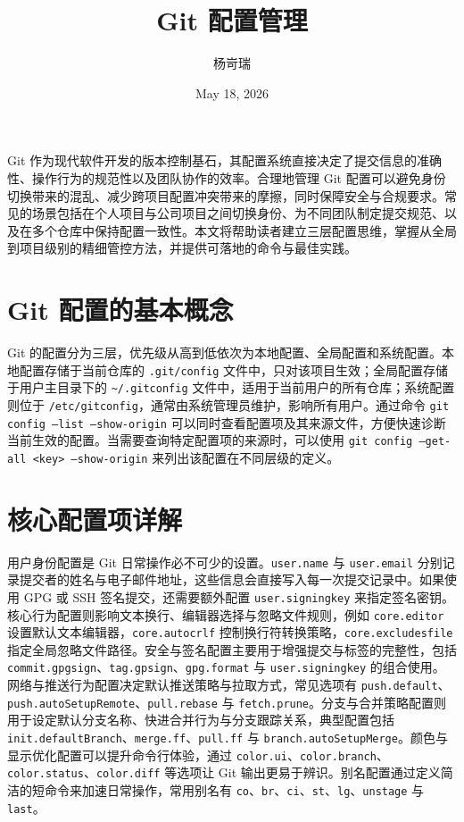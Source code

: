 \title{Git 配置管理}
\author{杨岢瑞}
\date{May 18, 2026}
\maketitle
Git 作为现代软件开发的版本控制基石，其配置系统直接决定了提交信息的准确性、操作行为的规范性以及团队协作的效率。合理地管理 Git 配置可以避免身份切换带来的混乱、减少跨项目配置冲突带来的摩擦，同时保障安全与合规要求。常见的场景包括在个人项目与公司项目之间切换身份、为不同团队制定提交规范、以及在多个仓库中保持配置一致性。本文将帮助读者建立三层配置思维，掌握从全局到项目级别的精细管控方法，并提供可落地的命令与最佳实践。\par
\chapter{Git 配置的基本概念}
Git 的配置分为三层，优先级从高到低依次为本地配置、全局配置和系统配置。本地配置存储于当前仓库的 \texttt{.git/config} 文件中，只对该项目生效；全局配置存储于用户主目录下的 \texttt{\~{}/.gitconfig} 文件中，适用于当前用户的所有仓库；系统配置则位于 \texttt{/etc/gitconfig}，通常由系统管理员维护，影响所有用户。通过命令 \texttt{git config --list --show-origin} 可以同时查看配置项及其来源文件，方便快速诊断当前生效的配置。当需要查询特定配置项的来源时，可以使用 \texttt{git config --get-all <key> --show-origin} 来列出该配置在不同层级的定义。\par
\chapter{核心配置项详解}
用户身份配置是 Git 日常操作必不可少的设置。\texttt{user.name} 与 \texttt{user.email} 分别记录提交者的姓名与电子邮件地址，这些信息会直接写入每一次提交记录中。如果使用 GPG 或 SSH 签名提交，还需要额外配置 \texttt{user.signingkey} 来指定签名密钥。核心行为配置则影响文本换行、编辑器选择与忽略文件规则，例如 \texttt{core.editor} 设置默认文本编辑器，\texttt{core.autocrlf} 控制换行符转换策略，\texttt{core.excludesfile} 指定全局忽略文件路径。安全与签名配置主要用于增强提交与标签的完整性，包括 \texttt{commit.gpgsign}、\texttt{tag.gpsign}、\texttt{gpg.format} 与 \texttt{user.signingkey} 的组合使用。网络与推送行为配置决定默认推送策略与拉取方式，常见选项有 \texttt{push.default}、\texttt{push.autoSetupRemote}、\texttt{pull.rebase} 与 \texttt{fetch.prune}。分支与合并策略配置则用于设定默认分支名称、快进合并行为与分支跟踪关系，典型配置包括 \texttt{init.defaultBranch}、\texttt{merge.ff}、\texttt{pull.ff} 与 \texttt{branch.autoSetupMerge}。颜色与显示优化配置可以提升命令行体验，通过 \texttt{color.ui}、\texttt{color.branch}、\texttt{color.status}、\texttt{color.diff} 等选项让 Git 输出更易于辨识。别名配置通过定义简洁的短命令来加速日常操作，常用别名有 \texttt{co}、\texttt{br}、\texttt{ci}、\texttt{st}、\texttt{lg}、\texttt{unstage} 与 \texttt{last}。\par

